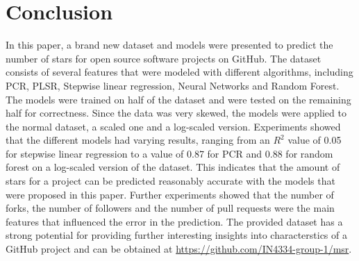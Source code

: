 \section{Conclusion}
	In this paper, a brand new dataset and models were presented to predict the number of stars for open source software projects on GitHub.
	The dataset consists of several features that were modeled with different algorithms, including PCR, PLSR, Stepwise linear regression, Neural Networks and Random Forest.
	The models were trained on half of the dataset and were tested on the remaining half for correctness.
	Since the data was very skewed, the models were applied to the normal dataset, a scaled one and a log-scaled version.
	Experiments showed that the different models had varying results, ranging from an $R^2$ value of 0.05 for stepwise linear regression to a value of 0.87 for PCR and 0.88 for random forest on a log-scaled version of the dataset.
	This indicates that the amount of stars for a project can be predicted reasonably accurate with the models that were proposed in this paper.
	Further experiments showed that the number of forks, the number of followers and the number of pull requests were the main features that influenced the error in the prediction.
	The provided dataset has a strong potential for providing further interesting insights into characterstics of a GitHub project and can be obtained at \url{https://github.com/IN4334-group-1/msr}.
